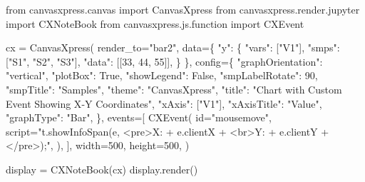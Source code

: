 \documentclass[
  letterpaper,
  DIV=11,
  numbers=noendperiod]{scrartcl}
\newenvironment{Shaded}{\begin{snugshade}}{\end{snugshade}}
\newcommand{\BuiltInTok}[1]{\textcolor[rgb]{0.00,0.23,0.31}{#1}}
\newcommand{\DecValTok}[1]{\textcolor[rgb]{0.68,0.00,0.00}{#1}}
\newcommand{\ImportTok}[1]{\textcolor[rgb]{0.00,0.46,0.62}{#1}}
\newcommand{\NormalTok}[1]{\textcolor[rgb]{0.00,0.23,0.31}{#1}}
\newcommand{\OperatorTok}[1]{\textcolor[rgb]{0.37,0.37,0.37}{#1}}
\newcommand{\StringTok}[1]{\textcolor[rgb]{0.13,0.47,0.30}{#1}}
\newcommand{\VariableTok}[1]{\textcolor[rgb]{0.07,0.07,0.07}{#1}}
\begin{document}
\begin{Shaded}
\begin{Highlighting}[]
\ImportTok{from}\NormalTok{ canvasxpress.canvas }\ImportTok{import}\NormalTok{ CanvasXpress}
\ImportTok{from}\NormalTok{ canvasxpress.render.jupyter }\ImportTok{import}\NormalTok{ CXNoteBook}
\ImportTok{from}\NormalTok{ canvasxpress.js.function }\ImportTok{import}\NormalTok{ CXEvent}

\NormalTok{cx }\OperatorTok{=}\NormalTok{ CanvasXpress(}
\NormalTok{    render\_to}\OperatorTok{=}\StringTok{"bar2"}\NormalTok{,}
\NormalTok{    data}\OperatorTok{=}\NormalTok{\{}
        \StringTok{"y"}\NormalTok{: \{}
            \StringTok{"vars"}\NormalTok{: [}\StringTok{"V1"}\NormalTok{],}
            \StringTok{"smps"}\NormalTok{: [}\StringTok{"S1"}\NormalTok{, }\StringTok{"S2"}\NormalTok{, }\StringTok{"S3"}\NormalTok{],}
            \StringTok{"data"}\NormalTok{: [[}\DecValTok{33}\NormalTok{, }\DecValTok{44}\NormalTok{, }\DecValTok{55}\NormalTok{]],}
\NormalTok{        \}}
\NormalTok{    \},}
\NormalTok{    config}\OperatorTok{=}\NormalTok{\{}
        \StringTok{"graphOrientation"}\NormalTok{: }\StringTok{"vertical"}\NormalTok{,}
        \StringTok{"plotBox"}\NormalTok{: }\VariableTok{True}\NormalTok{,}
        \StringTok{"showLegend"}\NormalTok{: }\VariableTok{False}\NormalTok{,}
        \StringTok{"smpLabelRotate"}\NormalTok{: }\DecValTok{90}\NormalTok{,}
        \StringTok{"smpTitle"}\NormalTok{: }\StringTok{"Samples"}\NormalTok{,}
        \StringTok{"theme"}\NormalTok{: }\StringTok{"CanvasXpress"}\NormalTok{,}
        \StringTok{"title"}\NormalTok{: }\StringTok{"Chart with Custom Event Showing X{-}Y Coordinates"}\NormalTok{,}
        \StringTok{"xAxis"}\NormalTok{: [}\StringTok{"V1"}\NormalTok{],}
        \StringTok{"xAxisTitle"}\NormalTok{: }\StringTok{"Value"}\NormalTok{,}
        \StringTok{"graphType"}\NormalTok{: }\StringTok{"Bar"}\NormalTok{,}
\NormalTok{    \},}
\NormalTok{    events}\OperatorTok{=}\NormalTok{[}
\NormalTok{        CXEvent(}
            \BuiltInTok{id}\OperatorTok{=}\StringTok{"mousemove"}\NormalTok{,}
\NormalTok{            script}\OperatorTok{=}\StringTok{"t.showInfoSpan(e, \textquotesingle{}\textless{}pre\textgreater{}X: \textquotesingle{} + e.clientX + \textquotesingle{}\textless{}br\textgreater{}Y: \textquotesingle{} + e.clientY + \textquotesingle{}\textless{}/pre\textgreater{}\textquotesingle{});"}\NormalTok{,}
\NormalTok{        ),}
\NormalTok{    ],}
\NormalTok{    width}\OperatorTok{=}\DecValTok{500}\NormalTok{,}
\NormalTok{    height}\OperatorTok{=}\DecValTok{500}\NormalTok{,}
\NormalTok{)}

\NormalTok{display }\OperatorTok{=}\NormalTok{ CXNoteBook(cx)}
\NormalTok{display.render()}
\end{Highlighting}
\end{Shaded}
\end{document}
